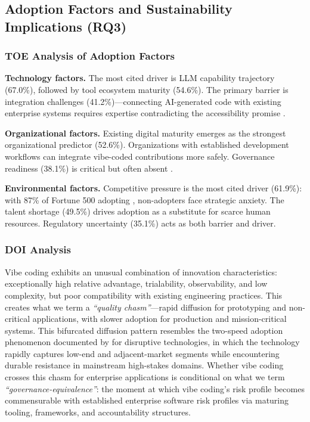\documentclass[preprint,12pt,authoryear]{elsarticle}
\begin{document}
\subsection{Adoption Factors and Sustainability Implications (RQ3)}
\label{sec:RQ3}

\subsubsection{TOE Analysis of Adoption Factors}

\textbf{Technology factors.} The most cited driver is LLM capability trajectory (67.0\%), followed by tool ecosystem maturity (54.6\%). The primary barrier is integration challenges (41.2\%)---connecting AI-generated code with existing enterprise systems requires expertise contradicting the accessibility promise \citep{Fawzy2025, SurveyVibeCoding2025}.

\textbf{Organizational factors.} Existing digital maturity emerges as the strongest organizational predictor (52.6\%). Organizations with established development workflows can integrate vibe-coded contributions more safely. Governance readiness (38.1\%) is critical but often absent \citep{HCLTech2025, Genpact2025}.

\textbf{Environmental factors.} Competitive pressure is the most cited driver (61.9\%): with 87\% of Fortune 500 adopting \citep{Shmargad2025}, non-adopters face strategic anxiety. The talent shortage (49.5\%) drives adoption as a substitute for scarce human resources. Regulatory uncertainty (35.1\%) acts as both barrier and driver.

\subsubsection{DOI Analysis}

Vibe coding exhibits an unusual combination of innovation characteristics: exceptionally high relative advantage, trialability, observability, and low complexity, but poor compatibility with existing engineering practices. This creates what we term a \emph{``quality chasm''}---rapid diffusion for prototyping and non-critical applications, with slower adoption for production and mission-critical systems. This bifurcated diffusion pattern resembles the two-speed adoption phenomenon documented by \citet{Christensen2015} for disruptive technologies, in which the technology rapidly captures low-end and adjacent-market segments while encountering durable resistance in mainstream high-stakes domains. Whether vibe coding crosses this chasm for enterprise applications \citep{Moore2014} is conditional on what we term \emph{``governance-equivalence''}: the moment at which vibe coding's risk profile becomes commensurable with established enterprise software risk profiles via maturing tooling, frameworks, and accountability structures.
\end{document}
